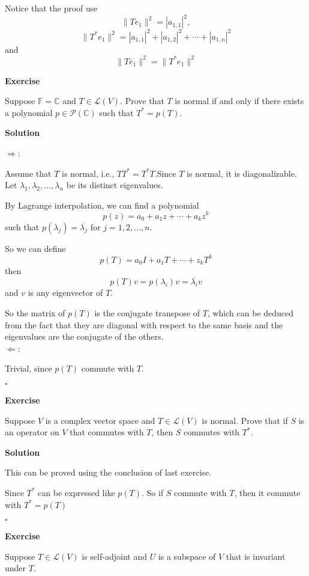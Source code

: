 \documentclass{article}
\newenvironment{exercise}{%
{\textbf{Exercise\\}
    }
}{
}
\newenvironment{solution}{%
{
    \textbf{Solution\\}
    }
}{
  \hfill $\square$ 
  \par\bigskip 
}
\newcommand{\RR}{\mathbb{R}}
\newcommand{\CC}{\mathbb{C}}
\newcommand{\FF}{\mathbb{F}}
\begin{document}
\begin{CJK}{UTF8}{gkai}
Notice that the proof use 
\[\|Te_1\|^2 = |a_{1,1}|^2,
\]
\[\|T^\ast e_1\|^2 = |a_{1,1}|^2 + |a_{1,2}|^2 + \cdots + |a_{1,n}|^2\]
and
\[\|Te_1\|^2 = \|T^\ast e_1\|^2\]

\begin{exercise}
    Suppose $\FF = \CC$ and $T \in \mathcal{L}(V)$. Prove that $T$ is normal if and only if there exists a polynomial $p \in  \mathcal{P}(\CC)$ such that $T^\ast = p(T)$.    
\end{exercise}

\begin{solution}
    $\Rightarrow$:

    Assume that $T$ is normal, i.e., $TT^\ast = T^\ast T$.Since $T$ is normal, it is diagonalizable. Let $\lambda_1, \lambda_2, \ldots, \lambda_n$ be its distinct eigenvalues.

    By Lagrange interpolation, we can find a polynomial
    \[p(z) = a_0 + a_1 z + \cdots + a_k z^k\]
    such that $p(\lambda_j) = \overline{\lambda_j}$ for $j = 1, 2, \ldots, n$.

    So we can define 
    \[p(T) = a_0 I + a_1 T + \cdots + z_k T^k\]
    then 
    \[p(T) v = p(\lambda_i) v = \overline{\lambda_i} v\]
    and $v$ is any eigenvector of $T$.

    So the matrix of $p(T)$ is the conjugate transpose of $T$, which can be deduced from the fact that they are diagonal with respect to the same basis and the eigenvalues are the conjugate of the others.\\

    $\Leftarrow$:

    Trivial, since $p(T)$ commute with $T$.
    
\end{solution}

\begin{exercise}
    Suppose $V$ is a complex vector space and $T \in  \mathcal{L}(V)$ is normal. Prove that if $S$ is an operator on $V$ that commutes with $T$, then $S$ commutes with $T^\ast$.
\end{exercise}    

\begin{solution}
    This can be proved using the conclusion of last exercise.

    Since $T^\ast$ can be expressed like $p(T)$. So if $S$ commute with $T$, then it commute with $T^\ast = p(T)$ 
\end{solution}
    
\begin{exercise}
    Suppose $T \in \mathcal{L}(V)$ is self-adjoint and $U$ is a subspace of $V$ that is invariant under $T$.


\end{exercise}
\end{CJK}
\end{document}
